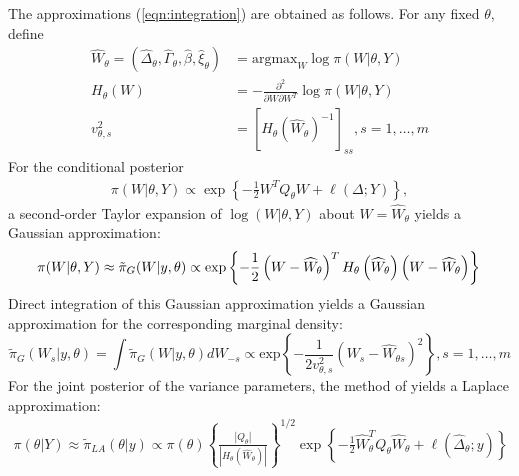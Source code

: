 \documentclass[]{article}
\begin{document}
The approximations (\ref{eqn:integration}) are obtained as follows. For any fixed $\theta$, define
\begin{equation}\begin{aligned}\label{eqn:modeandhessian}
\widehat{W}_{\theta} = \left( \widehat{\Delta}_{\theta},\widehat{\Gamma}_{\theta},\widehat{\beta},\widehat{\xi}_{\theta}\right) &= \text{argmax}_{W}\log\pi(W|\theta,Y) \\ 
H_{\theta}(W) &= -\frac{\partial^{2}}{\partial W \partial W^{T}}\log\pi(W|\theta,Y) \\
v_{\theta,s}^{2} &= \left[H_\theta \left(\widehat{W}_{\theta}\right) ^ {-1} \right]_{ss}, s = 1,\ldots,m
\end{aligned}\end{equation}
For the conditional posterior
\begin{equation}\begin{aligned}\label{eqn:condpost}
\pi(W|\theta,Y) \propto \exp\left\lbrace -\frac{1}{2}W^{T}Q_{\theta}W + \ell\left(\Delta;Y\right)\right\rbrace,
\end{aligned}\end{equation}
a second-order Taylor expansion of $\log(W|\theta,Y)$ about $W = \widehat{W}_{\theta}$ yields a Gaussian approximation:
\begin{equation}\label{eqn:gaussianapprox}
\pi(W|\theta,Y) \approx \tilde{\pi}_{G}(W|y,\theta) \propto \text{exp}\left\{-\frac{1}{2} \left(W-\widehat{W}_{\theta} \right)^T H_\theta\left(\widehat{W}_{\theta}\right) \left(W-\widehat{W}_{\theta} \right) \right\} \\
\end{equation}
Direct integration of this Gaussian approximation yields a Gaussian approximation for the corresponding marginal density:
\begin{equation}\label{eqb:marginalgaussianapprox}
\tilde{\pi}_{G}(W_{s}|y,\theta) = \int\tilde{\pi}_{G}(W|y,\theta)dW_{-s} \propto\text{exp}\left\{-\frac{1}{2v_{\theta,s}^{2}} \left(W_s-\widehat{W}_{\theta s} \right)^2 \right\}, s = 1,\ldots,m
\end{equation}
For the joint posterior of the variance parameters, the method of \citet{tierney} yields a Laplace approximation:
\begin{equation}\begin{aligned}\label{eqn:laplace}
\pi(\theta|Y) \approx \tilde{\pi}_{LA}(\theta|y) \propto \pi(\theta)\left\{\frac{\left|Q_{\theta}\right|}{\left|H_{\theta}\left(\widehat{W}_{\theta}\right)\right|}\right\}^{1/2}\exp\left\{ -\frac{1}{2}\widehat{W}_{\theta}^{T}Q_{\theta}\widehat{W}_{\theta} + \ell\left(\widehat{\Delta}_{\theta};y \right)\right\}
\end{aligned}\end{equation}
\end{document}

